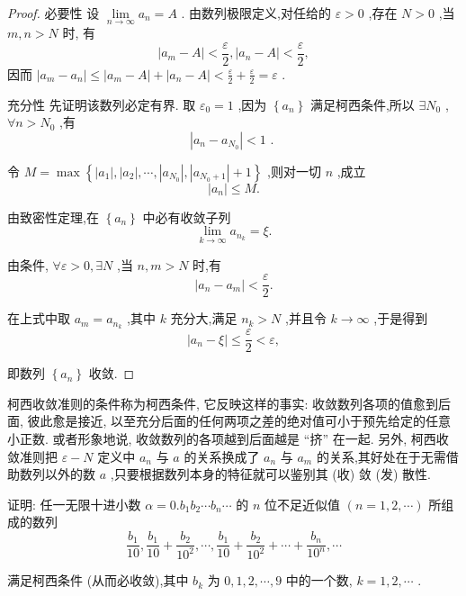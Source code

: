 \begin{proof}
必要性 设 \(\mathop{\lim }\limits_{{n \rightarrow  \infty }}{a}_{n} = A\) . 由数列极限定义,对任给的 \(\varepsilon  > 0\) ,存在 \(N > 0\) ,当 \(m,n > N\) 时, 有
\[
\left| {{a}_{m} - A}\right|  < \frac{\varepsilon }{2},\left| {{a}_{n} - A}\right|  < \frac{\varepsilon }{2},
\]
因而 \(\left| {{a}_{m} - {a}_{n}}\right|  \leq  \left| {{a}_{m} - A}\right|  + \left| {{a}_{n} - A}\right|  < \frac{\varepsilon }{2} + \frac{\varepsilon }{2} = \varepsilon\) .

充分性 先证明该数列必定有界. 取 \({\varepsilon }_{0} = 1\) ,因为 \(\left\{  {a}_{n}\right\}\) 满足柯西条件,所以 \(\exists {N}_{0}\) , \(\forall n > {N}_{0}\) ,有
\[
\left| {{a}_{n} - {a}_{{N}_{0}}}\right|  < 1\text{ . }
\]

令 \(M = \max \left\{  {\left| {a}_{1}\right| ,\left| {a}_{2}\right| ,\cdots ,\left| {a}_{{N}_{0}}\right| ,\left| {a}_{{N}_{0} + 1}\right|  + 1}\right\}\) ,则对一切 \(n\) ,成立
\[
\left| {a}_{n}\right|  \leq  M.
\]

由致密性定理,在 \(\left\{  {a}_{n}\right\}\) 中必有收敛子列
\[
\mathop{\lim }\limits_{{k \rightarrow  \infty }}{a}_{{n}_{k}} = \xi .
\]

由条件, \(\forall \varepsilon  > 0,\exists N\) ,当 \(n,m > N\) 时,有
\[
\left| {{a}_{n} - {a}_{m}}\right|  < \frac{\varepsilon }{2}.
\]

在上式中取 \({a}_{m} = {a}_{{n}_{k}}\) ,其中 \(k\) 充分大,满足 \({n}_{k} > N\) ,并且令 \(k \rightarrow  \infty\) ,于是得到
\[
\left| {{a}_{n} - \xi }\right|  \leq  \frac{\varepsilon }{2} < \varepsilon ,
\]

即数列 \(\left\{  {a}_{n}\right\}\) 收敛.
\end{proof}


柯西收敛准则的条件称为柯西条件, 它反映这样的事实: 收敛数列各项的值愈到后面, 彼此愈是接近, 以至充分后面的任何两项之差的绝对值可小于预先给定的任意小正数. 或者形象地说, 收敛数列的各项越到后面越是 “挤” 在一起. 另外, 柯西收敛准则把 \(\varepsilon  - N\) 定义中 \({a}_{n}\) 与 \(a\) 的关系换成了 \({a}_{n}\) 与 \({a}_{m}\) 的关系,其好处在于无需借助数列以外的数 \(a\) ,只要根据数列本身的特征就可以鉴别其 (收) 敛 (发) 散性.

\begin{example}
证明: 任一无限十进小数 \(\alpha  = 0.{b}_{1}{b}_{2}\cdots {b}_{n}\cdots\) 的 \(n\) 位不足近似值 \(\left( {n = 1,2,\cdots }\right)\) 所组成的数列
\[
\frac{{b}_{1}}{10},\frac{{b}_{1}}{10} + \frac{{b}_{2}}{{10}^{2}},\cdots ,\frac{{b}_{1}}{10} + \frac{{b}_{2}}{{10}^{2}} + \cdots  + \frac{{b}_{n}}{{10}^{n}},\cdots  \tag{1}
\]

满足柯西条件 (从而必收敛),其中 \({b}_{k}\) 为 \(0,1,2,\cdots ,9\) 中的一个数, \(k = 1,2,\cdots\) .
\end{example}


